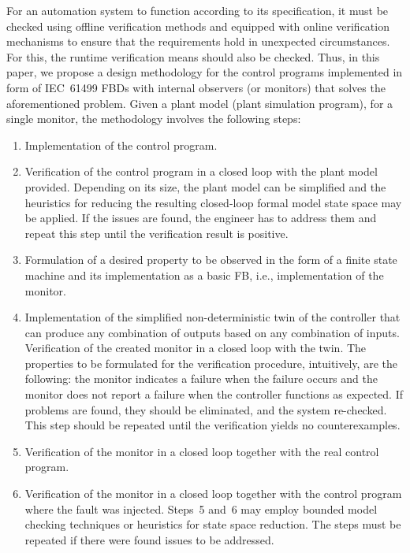 \documentclass[conference]{IEEEtran}
\begin{document}
For an automation system to function according to its specification, it must be checked using offline verification methods and equipped with online verification mechanisms to ensure that the requirements hold in unexpected circumstances. For this, the runtime verification means should also be checked.
Thus, in this paper, we propose a design methodology for the control programs implemented in form of IEC~61499 FBDs with internal observers (or monitors) that solves the aforementioned problem. Given a plant model (plant simulation program), for a single monitor, the methodology involves the following steps:
\begin{enumerate}
    \item Implementation of the control program.
    \item Verification of the control program in a closed loop with the plant model provided. Depending on its size, the plant model can be simplified and the heuristics for reducing the resulting closed-loop formal model state space may be applied. If the issues are found, the engineer has to address them and repeat this step until the verification result is positive.
    \item Formulation of a desired property to be observed in the form of a finite state machine and its implementation as a basic FB, i.e., implementation of the monitor.
    \item Implementation of the simplified non-deterministic twin of the controller that can produce any combination of outputs based on any combination of inputs. Verification of the created monitor in a closed loop with the twin. The properties to be formulated for the verification procedure, intuitively, are the following: the monitor indicates a failure when the failure occurs and the monitor does not report a failure when the controller functions as expected. If problems are found, they should be eliminated, and the system re-checked. This step should be repeated until the verification yields no counterexamples.
    \item Verification of the monitor in a closed loop together with the real control program.
    \item Verification of the monitor in a closed loop together with the control program where the fault was injected. Steps~5 and~6 may employ bounded model checking techniques or heuristics for state space reduction. The steps must be repeated if there were found issues to be addressed.
\end{enumerate}
\end{document}
